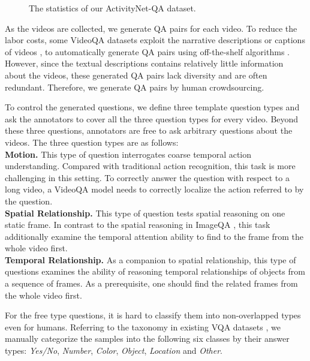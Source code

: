 \documentclass[letterpaper]{article} \usepackage{aaai19}  \usepackage{times}  \usepackage{helvet}  \usepackage{courier}  \usepackage{url}  \usepackage{graphicx}  \usepackage{amsfonts}
\begin{document}
\begin{figure*}
\centering
{}
\caption{The statistics of our ActivityNet-QA dataset. }
\label{fig:div_comparasion}
\end{figure*}
As the videos are collected, we generate QA pairs for each video. To reduce the labor costs, some VideoQA datasets exploit the narrative descriptions or captions of videos \cite{jang2017tgif,xu2017video}, to automatically generate QA pairs using off-the-shelf algorithms \cite{ren2015exploring}. However, since the textual descriptions contains relatively little information about the videos, these generated QA pairs lack diversity and are often redundant. Therefore, we generate QA pairs by human crowdsourcing.

To control the generated questions, we define three template question types and ask the annotators to cover all the three question types for every video. Beyond these three questions, annotators are free to ask arbitrary questions about the videos. The three question types are as follows:
\\
\textbf{Motion.} This type of question interrogates coarse temporal action understanding. Compared with traditional action recognition, this task is more challenging in this setting. To correctly answer the question with respect to a long video, a VideoQA model needs to correctly localize the action referred to by the question.
\\
\textbf{Spatial Relationship.} This type of question tests spatial reasoning on one static frame. In contrast to the spatial reasoning in ImageQA \cite{johnson2017clevr}, this task additionally examine the temporal attention ability to find to the frame from the whole video first.
\\
\textbf{Temporal Relationship.} As a companion to spatial relationship, this type of questions examines the ability of reasoning temporal relationships of objects from a sequence of frames. As a prerequisite, one should find the related frames from the whole video first.

For the free type questions, it is hard to classify them into non-overlapped types even for humans. Referring to the taxonomy in existing VQA datasets \cite{ren2015exploring,antol2015vqa}, we manually categorize the samples into the following six classes by their answer types: \emph{Yes/No}, \emph{Number}, \emph{Color}, \emph{Object}, \emph{Location} and \emph{Other}.
\end{document}
